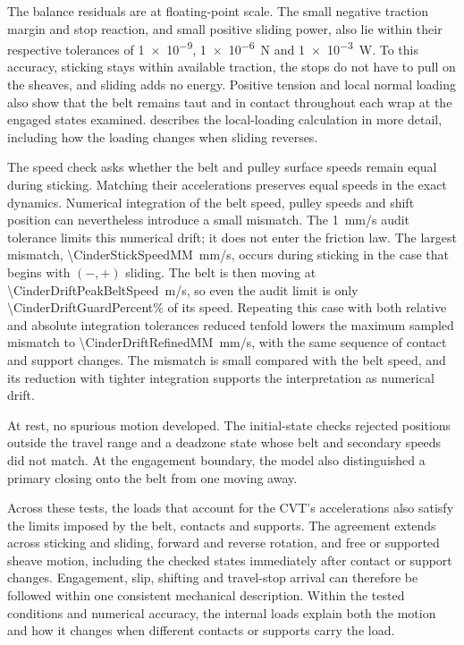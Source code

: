\documentclass[11pt]{report}
\numberwithin{equation}{section}
\begin{document}
The balance residuals are at floating-point scale. The small negative
traction margin and stop reaction, and small positive sliding power, also
lie within their respective tolerances
of \num{1e-9}, \SI{1e-6}{N} and \SI{1e-3}{W}. To this accuracy, sticking
stays within available traction, the stops do not have to pull on the sheaves,
and sliding adds no energy. Positive tension and local normal loading also
show that the belt remains taut and in contact throughout each wrap at the
engaged states examined.  describes
the local-loading calculation in more detail, including how the loading
changes when sliding reverses.

The speed check asks whether the belt and pulley surface speeds remain equal
during sticking. Matching their accelerations preserves equal speeds in
the exact dynamics. Numerical integration of the belt speed, pulley speeds
and shift position can nevertheless introduce a small mismatch.
The \SI{1}{mm/s} audit tolerance limits
this numerical drift; it does not enter the friction law. The largest
mismatch, \SI{\CinderStickSpeedMM}{mm/s}, occurs during sticking in the case
that begins with $(-,+)$ sliding. The belt is then moving at
\SI{\CinderDriftPeakBeltSpeed}{m/s}, so even the audit limit is only
\num{\CinderDriftGuardPercent}\% of its speed. Repeating this case with
both relative and absolute integration tolerances reduced tenfold lowers
the maximum sampled mismatch to \SI{\CinderDriftRefinedMM}{mm/s}, with the
same sequence of contact and support changes. The mismatch is small compared
with the belt speed, and its reduction with tighter integration supports
the interpretation as numerical drift.

At rest, no spurious motion developed. The initial-state checks rejected
positions outside the travel range and a deadzone state whose belt and
secondary speeds did not match. At the engagement boundary, the model also
distinguished a primary closing onto the belt from one moving away.

Across these tests, the loads that account for the CVT's accelerations also
satisfy the limits imposed by the belt, contacts and supports. The agreement
extends across sticking and sliding, forward and reverse rotation, and free
or supported sheave motion, including the checked states immediately after
contact or support changes. Engagement, slip, shifting and travel-stop
arrival can therefore be followed within one consistent mechanical
description. Within the tested conditions and numerical accuracy, the
internal loads explain both the motion and how it changes when different
contacts or supports carry the load.
\FloatBarrier
\end{document}

